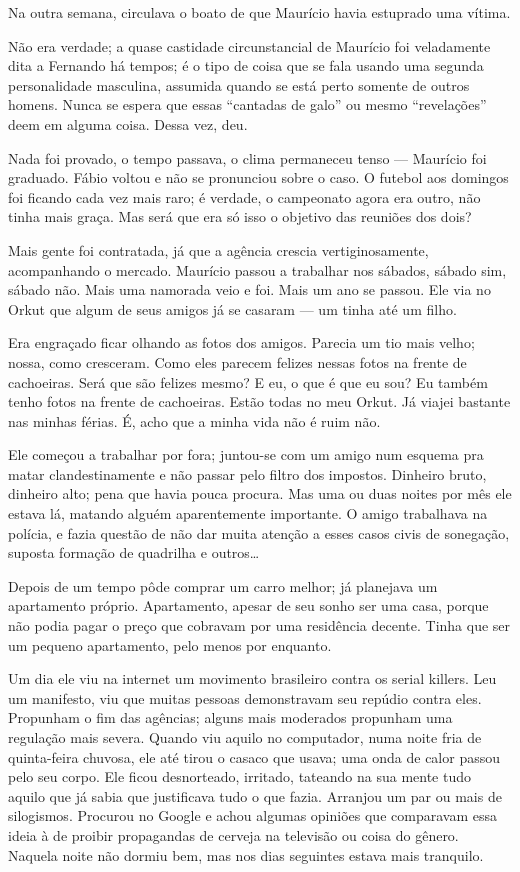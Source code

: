 Na outra semana, circulava o boato de que Maurício havia estuprado uma vítima.

Não era verdade; a quase castidade circunstancial de Maurício foi veladamente dita a Fernando há tempos; é o tipo de coisa que se fala usando uma segunda personalidade masculina, assumida quando se está perto somente de outros homens. Nunca se espera que essas ``cantadas de galo'' ou mesmo ``revelações'' deem em alguma coisa. Dessa vez, deu.

Nada foi provado, o tempo passava, o clima permaneceu tenso --- Maurício foi graduado. Fábio voltou e não se pronunciou sobre o caso. O futebol aos domingos foi ficando cada vez mais raro; é verdade, o campeonato agora era outro, não tinha mais graça. Mas será que era só isso o objetivo das reuniões dos dois?

Mais gente foi contratada, já que a agência crescia vertiginosamente, acompanhando o mercado. Maurício passou a trabalhar nos sábados, sábado sim, sábado não. Mais uma namorada veio e foi. Mais um ano se passou. Ele via no Orkut que algum de seus amigos já se casaram --- um tinha até um filho.

Era engraçado ficar olhando as fotos dos amigos. Parecia um tio mais velho; nossa, como cresceram. Como eles parecem felizes nessas fotos na frente de cachoeiras. Será que são felizes mesmo? E eu, o que é que eu sou? Eu também tenho fotos na frente de cachoeiras. Estão todas no meu Orkut. Já viajei bastante nas minhas férias. É, acho que a minha vida não é ruim não.

Ele começou a trabalhar por fora; juntou-se com um amigo num esquema pra matar clandestinamente e não passar pelo filtro dos impostos. Dinheiro bruto, dinheiro alto; pena que havia pouca procura. Mas uma ou duas noites por mês ele estava lá, matando alguém aparentemente importante. O amigo trabalhava na polícia, e fazia questão de não dar muita atenção a esses casos civis de sonegação, suposta formação de quadrilha e outros\ldots\,

Depois de um tempo pôde comprar um carro melhor; já planejava um apartamento próprio. Apartamento, apesar de seu sonho ser uma casa, porque não podia pagar o preço que cobravam por uma residência decente. Tinha que ser um pequeno apartamento, pelo menos por enquanto.

Um dia ele viu na internet um movimento brasileiro contra os serial killers. Leu um manifesto, viu que muitas pessoas demonstravam seu repúdio contra eles. Propunham o fim das agências; alguns mais moderados propunham uma regulação mais severa. Quando viu aquilo no computador, numa noite fria de quinta-feira chuvosa, ele até tirou o casaco que usava; uma onda de calor passou pelo seu corpo. Ele ficou desnorteado, irritado, tateando na sua mente tudo aquilo que já sabia que justificava tudo o que fazia. Arranjou um par ou mais de silogismos. Procurou no Google e achou algumas opiniões que comparavam essa ideia à de proibir propagandas de cerveja na televisão ou coisa do gênero. Naquela noite não dormiu bem, mas nos dias seguintes estava mais tranquilo.

